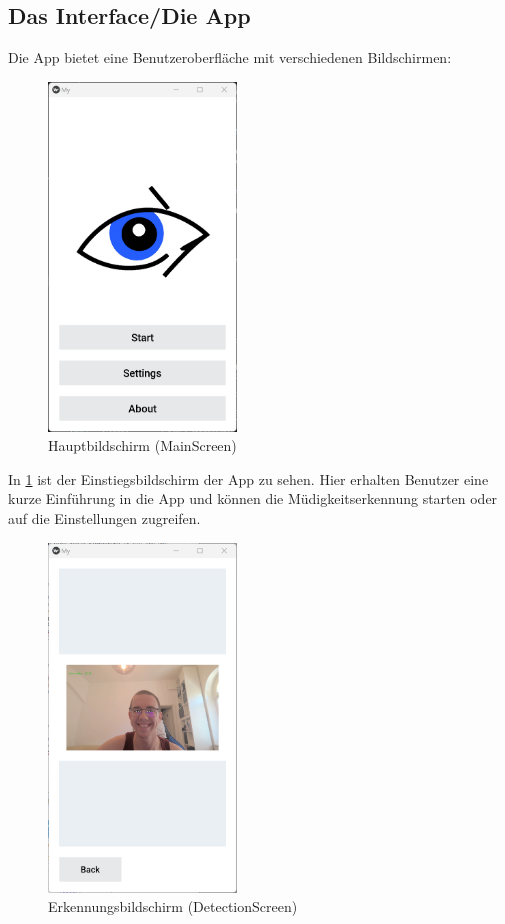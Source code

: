 \subsection{Das Interface/Die App}
\label{ssec:interface}

Die App bietet eine Benutzeroberfläche mit verschiedenen Bildschirmen:
\begin{figure}[h]
	\centering
	\includegraphics[width=5cm]{images/mainscreen.png} %
	\caption{Hauptbildschirm (MainScreen)}
	\label{fig:mainscreen}
\end{figure}
In \ref{fig:mainscreen} ist der Einstiegsbildschirm der App zu sehen. Hier erhalten Benutzer eine kurze Einführung in die App und können die Müdigkeitserkennung starten oder auf die Einstellungen zugreifen.
\begin{figure}[h]
	\centering
	\includegraphics[width=5cm]{images/detectionscreen.png} %
	\caption{Erkennungsbildschirm (DetectionScreen)}
	\label{fig:detectionscreen}
\end{figure}
